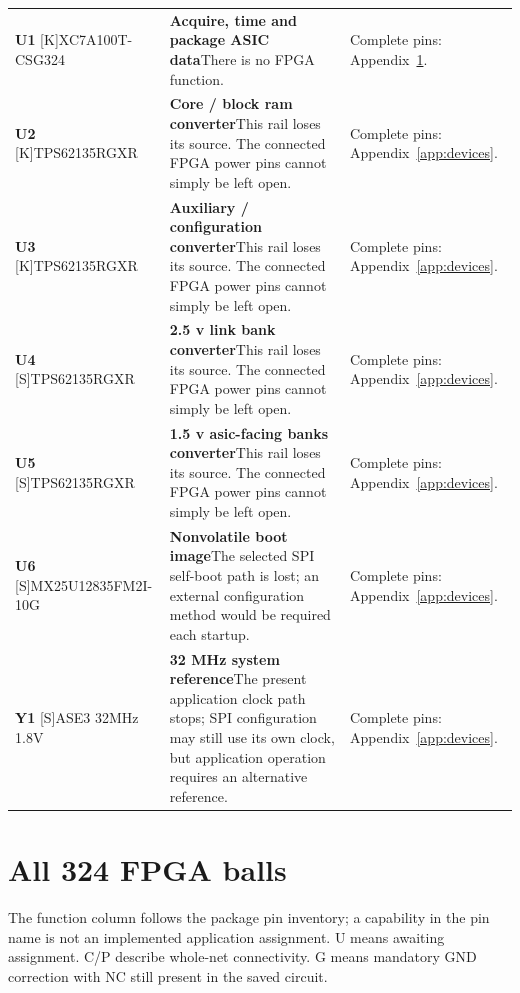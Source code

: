 \documentclass[11pt,a4paper]{article}
\begin{document}
\begin{longtable}{@{}P{27mm}P{77mm}P{62mm}@{}}
\textbf{U1} [K]\newline XC7A100T-CSG324 & \textbf{Acquire, time and package ASIC data}\newline There is no FPGA function. & Complete pins: Appendix~\ref{app:fpga}. \\
\textbf{U2} [K]\newline TPS62135RGXR & \textbf{Core / block ram converter}\newline This rail loses its source. The connected FPGA power pins cannot simply be left open. & Complete pins: Appendix~\ref{app:devices}. \\
\textbf{U3} [K]\newline TPS62135RGXR & \textbf{Auxiliary / configuration converter}\newline This rail loses its source. The connected FPGA power pins cannot simply be left open. & Complete pins: Appendix~\ref{app:devices}. \\
\textbf{U4} [S]\newline TPS62135RGXR & \textbf{2.5 v link bank converter}\newline This rail loses its source. The connected FPGA power pins cannot simply be left open. & Complete pins: Appendix~\ref{app:devices}. \\
\textbf{U5} [S]\newline TPS62135RGXR & \textbf{1.5 v asic-facing banks converter}\newline This rail loses its source. The connected FPGA power pins cannot simply be left open. & Complete pins: Appendix~\ref{app:devices}. \\
\textbf{U6} [S]\newline MX25U12835FM2I-10G & \textbf{Nonvolatile boot image}\newline The selected SPI self-boot path is lost; an external configuration method would be required each startup. & Complete pins: Appendix~\ref{app:devices}. \\
\textbf{Y1} [S]\newline ASE3 32MHz 1.8V & \textbf{32 MHz system reference}\newline The present application clock path stops; SPI configuration may still use its own clock, but application operation requires an alternative reference. & Complete pins: Appendix~\ref{app:devices}. \\
\end{longtable}\endgroup

\clearpage\section{All 324 FPGA balls}\label{app:fpga}
The function column follows the package pin inventory; a capability in the pin name is not an implemented application assignment. U means awaiting assignment. C/P describe whole-net connectivity. G means mandatory GND correction with NC still present in the saved circuit.
\end{document}
